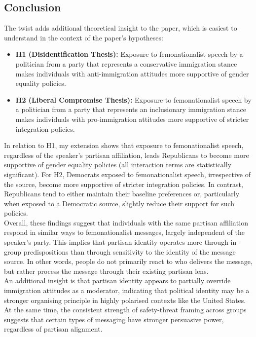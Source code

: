 \documentclass[12pt,letterpaper]{article}
\begin{document}
		\subsection*{Conclusion}
		The twist adds additional theoretical insight to the paper, which is easiest to understand in the context of the paper’s hypotheses:
		\begin{itemize}
			\item \textbf{H1 (Disidentification Thesis):} Exposure to femonationalist speech by a politician from a party that represents a conservative immigration stance makes individuals with anti-immigration attitudes more supportive of gender equality policies.
			\item \textbf{H2 (Liberal Compromise Thesis):} Exposure to femonationalist speech by a politician from a party that represents an inclusionary immigration stance makes individuals with pro-immigration attitudes more supportive of stricter integration policies.
	\end{itemize}
		\noindent In relation to H1, my extension shows that exposure to femonationalist speech, regardless of the speaker’s partisan affiliation, leads Republicans to become more supportive of gender equality policies (all interaction terms are statistically significant). For H2, Democrats exposed to femonationalist speech, irrespective of the source, become more supportive of stricter integration policies. In contrast, Republicans tend to either maintain their baseline preferences or, particularly when exposed to a Democratic source, slightly reduce their support for such policies. \\[.2cm]
		Overall, these findings suggest that individuals with the same partisan affiliation respond in similar ways to femonationalist messages, largely independent of the speaker’s party. This implies that partisan identity operates more through in-group predispositions than through sensitivity to the identity of the message source. In other words, people do not primarily react to who delivers the message, but rather process the message through their existing partisan lens. \\[.2cm]
		An additional insight is that partisan identity appears to partially override immigration attitudes as a moderator, indicating that political identity may be a stronger organising principle in highly polarised contexts like the United States. At the same time, the consistent strength of safety-threat framing across groups suggests that certain types of messaging have stronger persuasive power, regardless of partisan alignment. \\[.2cm]
\end{document}
